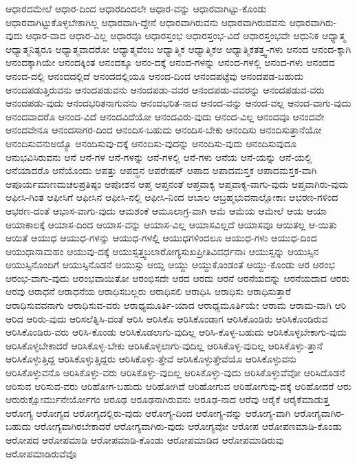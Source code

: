 {ಆಧಾರದಮೇಲೆ
ಆಧಾರ-ದಿಂದ
ಆಧಾರದಿಂದಲೇ
ಆಧಾರ-ವನ್ನು
ಆಧಾರವಾಗಿಟ್ಟು-ಕೊಂಡು
ಆಧಾರವಾಗಿಟ್ಟುಕೊಳ್ಳಬೇಕಾಗಿಲ್ಲ
ಆಧಾರವಾಗಿ-ದ್ದೇನೆ
ಆಧಾರವಾಗಿರುವನು
ಆಧಾರವಾಗಿರುವವನು
ಆಧಾರವಾಗಿರು-ವುದು
ಆಧಾರ-ವಾದ
ಆಧಾರ-ವಿಲ್ಲ
ಆಧಾರವೂ
ಆಧಾರಸ್ತಂಭ
ಆಧಾರಸ್ತಂಭ-ವಿದೆ
ಆಧಾರಸ್ತಂಭವೇ
ಆಧುನಿಕ
ಆಧ್ಯಾತ್ಮ
ಆಧ್ಯಾತ್ಮನಿತ್ಯರೂ
ಆಧ್ಯಾತ್ಮವಾದರೋ
ಆಧ್ಯಾತ್ಮವೆಂಬ
ಆಧ್ಯಾತ್ಮಿಕ
ಆಧ್ಯಾತ್ಮಿಕಅ
ಆಧ್ಯಾತ್ಮಿಕತತ್ತ್ವ-ಗಳು
ಆನಂದ
ಆನಂದ-ಕ್ಕಾಗಿ
ಆನಂದಕ್ಕಾಗಿಯೇ
ಆನಂದಕ್ಕಿಂತ
ಆನಂದಕ್ಕೂ
ಆನಂ-ದಕ್ಕೆ
ಆನಂದ-ಗಳನ್ನು
ಆನಂದ-ಗಳಲ್ಲಿ
ಆನಂದ-ಗಳು
ಆನಂದದ
ಆನಂದ-ದಲ್ಲಿ
ಆನಂದದಲ್ಲಿದೆ
ಆನಂದದಲ್ಲಿಯೂ
ಆನಂದ-ದಿಂದ
ಆನಂದಪಟ್ಟೆವು
ಆನಂದಪಡ-ಬಹುದು
ಆನಂದಪಡುತ್ತಿರುವನು
ಆನಂದಪಡುವನು
ಆನಂದಪಡು-ವವರ
ಆನಂದಪಡು-ವವರನ್ನು
ಆನಂದಪಡುವ-ವರು
ಆನಂದಪಡು-ವುದು
ಆನಂದಭರಿತನಾಗುವನು
ಆನಂದಭರಿತ-ನಾದ
ಆನಂದ-ವನ್ನು
ಆನಂದ-ವಲ್ಲ
ಆನಂದ-ವಾಗು-ವುದು
ಆನಂದವಾದರೊ
ಆನಂದ-ವಿದೆ
ಆನಂದವಿದೆಯೋ
ಆನಂದವಿರು-ವುದು
ಆನಂದ-ವಿಲ್ಲ
ಆನಂದವೂ
ಆನಂದವೇ
ಆನಂದವೇನೂ
ಆನಂದಸಾಗರ-ದಿಂದ
ಆನಂದಿಸ-ಬಹುದು
ಆನಂದಿಸ-ಬೇಕು
ಆನಂದಿಸು
ಆನಂದಿಸುತ್ತಾನೆಯೋ
ಆನಂದಿಸುವನುಅಯ್ಯೊ
ಆನಂದಿಸುವು-ದಕ್ಕೆ
ಆನಂದಿಸು-ವುದನ್ನು
ಆನಂದಿಸು-ವುದು
ಆನಂದಿಸುವುದೂ
ಆನುಭವಿಸಿರುವನು
ಆನೆ
ಆನೆ-ಗಳ
ಆನೆ-ಗಳನ್ನು
ಆನೆ-ಗಳಲ್ಲಿ
ಆನೆ-ಗಳು
ಆನೆಯ
ಆನೆ-ಯನ್ನು
ಆನೆ-ಯಲ್ಲಿ
ಆನೆಯಾದರೊ
ಆನೆಯೊಂದು
ಆಪತ್ತು
ಆಪದ್ಧನ
ಆಪರೇಷನ್
ಆಪಾದ
ಆಪಾದಮಸ್ತಕ
ಆಪಾದಮಸ್ತಕ-ವಾಗಿ
ಆಪೂರ್ಯಮಾಣಮಚಲಪ್ರತಿಷ್ಠಂ
ಆಪೋಶನ
ಆಪ್ತ
ಆಪ್ತನಂತೆ
ಆಪ್ತವಾಕ್ಯ
ಆಪ್ತವಾಕ್ಯ-ವಾಗು-ವುದು
ಆಪ್ತವಾಗಿರು-ವುದು
ಆಫೀಸಿ-ಗಿಂತ
ಆಫೀಸಿಗೆ
ಆಫೀಸಿನ
ಆಫೀಸಿ-ನಲ್ಲಿ
ಆಫೀಸಿ-ನಿಂದ
ಆಬಾಲ
ಆಬ್ರಹ್ಮಭುವನಾಲ್ಲೋಕಾಃ
ಆಭರಣ-ಗಳಿಂದ
ಆಭರಣ-ದಂತೆ
ಆಭಾಸ-ವಾಗು-ವುದು
ಆಮಶಂಕೆ
ಆಮೂಲಾಗ್ರ-ವಾಗಿ
ಆಮೆ
ಆಮೆಯ
ಆಮೇಲೆ
ಆಯ
ಆಯಾ
ಆಯಾಕಾಲಕ್ಕೆ
ಆಯಾಸ-ದಿಂದ
ಆಯಾಸ-ವನ್ನು
ಆಯಾಸ-ವಿಲ್ಲ
ಆಯಾಸವಿಲ್ಲದೆ
ಆಯಾಸವೂ
ಆಯಿತಲ್ಲ
ಆ-ಯಿತು
ಆಯಿತೆ
ಆಯುಧ
ಆಯುಧ-ಗಳನ್ನು
ಆಯುಧ-ಗಳಲ್ಲಿ
ಆಯುಧಗಳಿಂದಲೂ
ಆಯುಧ-ಗಳು
ಆಯುಧ-ದಿಂದ
ಆಯುಧಾನಾಮಹಂ
ಆಯುವು-ದಕ್ಕೆ
ಆಯುಸ್ಸತ್ತ್ವಬಲಾರೋಗ್ಯಸುಖಪ್ರೀತಿವಿವರ್ಧನಾಃ
ಆಯುಸ್ಸನ್ನು
ಆಯುಸ್ಸಿನ
ಆಯುಸ್ಸಿನೊಂದಿಗೆ
ಆಯುಸ್ಸಿನೊಡನೆ
ಆಯುಸ್ಸು
ಆಯ್ದ
ಆಯ್ದು
ಆಯ್ದುಕೊಂಡಂತೆ
ಆಯ್ದು-ಕೊಂಡು
ಆರ
ಆರಂಭ
ಆರಂಭ-ವಾಗು-ವುದು
ಆರಂಭವಾಯಿತೋ
ಆರಂಭಿಸದೇ
ಆರದ
ಆರದು
ಆರನೆ
ಆರನೆಯದನ್ನು
ಆರನೆಯದಾದ
ಆರರು
ಆರವು
ಆರಾಧನೆ
ಆರಾಧನೆಯ
ಆರಾಧಿಸಬಲ್ಲರು
ಆರಾಧಿಸಲಿ
ಆರಾಧಿಸಿ
ಆರಾಧಿಸು
ಆರಾಧಿಸುತ್ತಾರೆ
ಆರಾಧಿಸುವವನಾಗು
ಆರಾಧಿಸುವ-ವರು
ಆರಾಧ್ಯಮೂರ್ತಿ-ಯಾದ
ಆರಾಧ್ಯಮೂರ್ತಿಯೇ
ಆರಾಮ
ಆರಾಮ-ವಾಗಿ
ಆರಿ
ಆರಿದ
ಆರಿರು-ವುದು
ಆರಿಸಲೆತ್ನಿಸಿ-ದಂತೆ
ಆರಿಸಿ
ಆರಿಸಿಕೊ
ಆರಿಸಿಕೊಂಡಾಗ
ಆರಿಸಿಕೊಂಡಿರು
ಆರಿಸಿಕೊಂಡಿರುವ
ಆರಿಸಿಕೊಂಡಿರು-ವರು
ಆರಿಸಿ-ಕೊಂಡು
ಆರಿಸಿಕೊಡಲಾಗು-ವುದಿಲ್ಲ
ಆರಿಸಿ-ಕೊಳ್ಳ-ಬಹುದು
ಆರಿಸಿಕೊಳ್ಳಬೇಕಾಗು-ವುದು
ಆರಿಸಿಕೊಳ್ಳಬೇಕಾದರೆ
ಆರಿಸಿಕೊಳ್ಳ-ಬೇಕು
ಆರಿಸಿಕೊಳ್ಳಲಾಗು-ವುದಿಲ್ಲ
ಆರಿಸಿಕೊಳ್ಳ-ವುದಿಲ್ಲ
ಆರಿಸಿಕೊಳ್ಳು-ತ್ತಾನೆ
ಆರಿಸಿಕೊಳ್ಳುತ್ತಿದ್ದ
ಆರಿಸಿಕೊಳ್ಳುತ್ತಿದ್ದರು
ಆರಿಸಿಕೊಳ್ಳು-ತ್ತೇವೆ
ಆರಿಸಿಕೊಳ್ಳುತ್ತೇವೆಯೊ
ಆರಿಸಿಕೊಳ್ಳುವನು
ಆರಿಸಿಕೊಳ್ಳುವನೊ
ಆರಿಸಿಕೊಳ್ಳು-ವರು
ಆರಿಸಿಕೊಳ್ಳು-ವುದಿಲ್ಲ
ಆರಿಸಿಕೊಳ್ಳು-ವುದು
ಆರಿಸಿಕೊಳ್ಳುವೆವೋ
ಆರಿಸಿದೊಡನೆ
ಆರಿಸುವ
ಆರಿಸುವ-ವರು
ಆರಿಹೋಗ-ಬಹುದು
ಆರಿಹೋಗಿದೆ
ಆರಿಹೋಗುವ
ಆರಿಹೋಗುವು-ದಕ್ಕೆ
ಆರಿಹೋದರೆ
ಆರು
ಆರುರುಕ್ಷೋರ್ಮುನೇರ್ಯೋಗಂ
ಆರೂಢ
ಆರೂಢನಾಗಿರುವನು
ಆರೂಢ-ನಾದ
ಆರೆವು
ಆರೈಕೆ
ಆರೈಕೆಮಾಡುತ್ತ
ಆರೋಗ್ಯ
ಆರೋಗ್ಯದ
ಆರೋಗ್ಯದಲ್ಲಿರು-ವುದು
ಆರೋಗ್ಯ-ದಿಂದ
ಆರೋಗ್ಯ-ವನ್ನು
ಆರೋಗ್ಯ-ವಾಗಿ
ಆರೋಗ್ಯವಾಗಿರ-ಬಹುದು
ಆರೋಗ್ಯವಾಗಿರಬೇಕಾದರೆ
ಆರೋಗ್ಯವಾಗಿರು-ವುದು
ಆರೋಗ್ಯವೋ
ಆರೋಪ
ಆರೋಪಣಮಾಡಿ-ಕೊಂಡು
ಆರೋಪದ
ಆರೋಪಮಾಡಿ
ಆರೋಪಮಾಡಿ-ಕೊಂಡು
ಆರೋಪಮಾಡಿದ
ಆರೋಪಮಾಡಿರುವು
ಆರೋಪಮಾಡಿರುವೆವೊ
}

